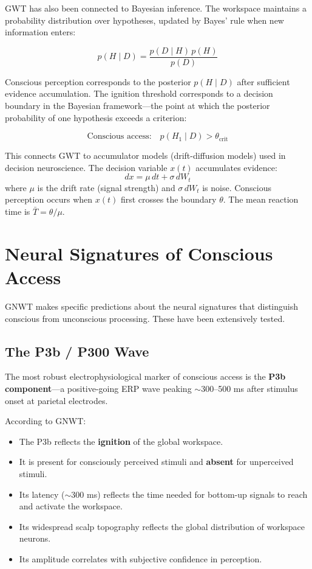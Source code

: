 \documentclass[11pt,a4paper]{report}
\begin{document}
GWT has also been connected to Bayesian inference. The workspace maintains a probability distribution over hypotheses, updated by Bayes' rule when new information enters:

\[
  p(H \mid D) = \frac{p(D \mid H)\, p(H)}{p(D)}
\]

Conscious perception corresponds to the posterior $p(H \mid D)$ after sufficient evidence accumulation. The ignition threshold corresponds to a decision boundary in the Bayesian framework---the point at which the posterior probability of one hypothesis exceeds a criterion:

\[
  \text{Conscious access:} \quad p(H_1 \mid D) > \theta_{\text{crit}}
\]

This connects GWT to accumulator models (drift-diffusion models) used in decision neuroscience. The decision variable $x(t)$ accumulates evidence:
\[
  dx = \mu\, dt + \sigma\, dW_t
\]
where $\mu$ is the drift rate (signal strength) and $\sigma\, dW_t$ is noise. Conscious perception occurs when $x(t)$ first crosses the boundary $\theta$. The mean reaction time is $\bar{T} = \theta / \mu$.


\chapter{Neural Signatures of Conscious Access}

GNWT makes specific predictions about the neural signatures that distinguish conscious from unconscious processing. These have been extensively tested.

\section{The P3b / P300 Wave}

The most robust electrophysiological marker of conscious access is the \textbf{P3b component}---a positive-going ERP wave peaking $\sim$300--500 ms after stimulus onset at parietal electrodes.

\begin{mechbox}
According to GNWT:
\begin{itemize}[leftmargin=1.5em]
  \item The P3b reflects the \textbf{ignition} of the global workspace.
  \item It is present for consciously perceived stimuli and \textbf{absent} for unperceived stimuli.
  \item Its latency ($\sim$300 ms) reflects the time needed for bottom-up signals to reach and activate the workspace.
  \item Its widespread scalp topography reflects the global distribution of workspace neurons.
  \item Its amplitude correlates with subjective confidence in perception.
\end{itemize}
\end{mechbox}
\end{document}
